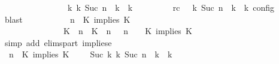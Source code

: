 \begin{isabellebody}
\ \ \ \ \ \ \ \ \ \ \ \ \ \ \ \ {\isasymhookrightarrow}\isactrlbsup k\isactrlesup \ {\isacharparenleft}{\isasymGamma}\isactrlsub k{\isacharcomma}\ Suc\ n\ {\isasymturnstile}\ {\isasymPsi}\isactrlsub k\ {\isasymtriangleright}\ {\isasymPhi}\isactrlsub k{\isacharparenright}{\isacartoucheclose}\isanewline
\ \ \ \ \ \ \ \ \ rc{\isacharcolon}{\isacartoucheopen}{\isasymrho}\ {\isasymin}\ {\isasymlbrakk}\ {\isasymGamma}\isactrlsub k{\isacharcomma}\ Suc\ n\ {\isasymturnstile}\ {\isasymPsi}\isactrlsub k\ {\isasymtriangleright}\ {\isasymPhi}\isactrlsub k\ {\isasymrbrakk}\isactrlsub c\isactrlsub o\isactrlsub n\isactrlsub f\isactrlsub i\isactrlsub g{\isacartoucheclose}\ \isamarkupfalse%
\ blast\isanewline
\ \ \ \ \ \ \ \ \isamarkupfalse%
\ {\isacartoucheopen}{\isacharparenleft}{\isasymGamma}{\isacharcomma}\ n\ {\isasymturnstile}\ {\isacharparenleft}{\isacharparenleft}K\ implies\ K\ {\isacharhash}\ {\isasymPsi}{\isacharparenright}\ {\isasymtriangleright}\ {\isasymPhi}{\isacharparenright}\isanewline
\ \ \ \ \ \ \ \ \ \ \ \ \ \ {\isasymhookrightarrow}\ {\isacharparenleft}{\isacharparenleft}{\isacharparenleft}K\ {\isasymUp}\ n{\isacharparenright}\ {\isacharhash}\ {\isacharparenleft}K\ {\isasymUp}\ n{\isacharparenright}\ {\isacharhash}\ {\isasymGamma}{\isacharparenright}{\isacharcomma}\ n\ {\isasymturnstile}\ {\isasymPsi}\ {\isasymtriangleright}\ {\isacharparenleft}{\isacharparenleft}K\ implies\ K\ {\isacharhash}\ {\isasymPhi}{\isacharparenright}{\isacharparenright}{\isacartoucheclose}\isanewline
\ \ \ \ \ \ \ \ \ \ \isamarkupfalse%
\ {\isacharparenleft}simp\ add{\isacharcolon}\ elims{\isacharunderscore}part\ implies{\isacharunderscore}e{}{\isacharparenright}\isanewline
\ \ \ \ \ \ \ \ \isamarkupfalse%
\ {\isacartoucheopen}{\isacharparenleft}{\isasymGamma}{\isacharcomma}\ n\ {\isasymturnstile}\ {\isacharparenleft}{\isacharparenleft}K\ implies\ K\ {\isacharhash}\ {\isasymPsi}{\isacharparenright}\ {\isasymtriangleright}\ {\isasymPhi}{\isacharparenright}\ {\isasymhookrightarrow}\isactrlbsup Suc\ k\isactrlesup \ {\isacharparenleft}{\isasymGamma}\isactrlsub k{\isacharcomma}\ Suc\ n\ {\isasymturnstile}\ {\isasymPsi}\isactrlsub k\ {\isasymtriangleright}\ {\isasymPhi}\isactrlsub k{\isacharparenright}{\isacartoucheclose}\isanewline

\end{isabellebody}
